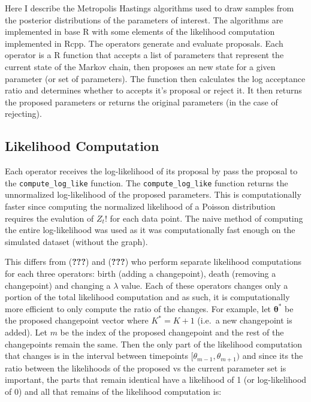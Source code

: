 \documentclass[]{article}
\numberwithin{equation}{section}
\begin{document}
Here I describe the Metropolis Hastings algorithms used to draw samples
from the posterior distributions of the parameters of interest. The
algorithms are implemented in base R with some elements of the
likelihood computation implemented in Rcpp. The operators generate and
evaluate proposals. Each operator is a R function that accepts a list of
parameters that represent the current state of the Markov chain, then
proposes an new state for a given parameter (or set of parameters). The
function then calculates the log acceptance ratio and determines whether
to accepts it's proposal or reject it. It then returns the proposed
parameters or returns the original parameters (in the case of
rejecting).

\hypertarget{likelihood-computation}{%
\subsection{Likelihood Computation}\label{likelihood-computation}}

Each operator receives the log-likelihood of its proposal by pass the
proposal to the \texttt{compute\_log\_like} function. The
\texttt{compute\_log\_like} function returns the unnormalized
log-likelihood of the proposed parameters. This is computationally
faster since computing the normalized likelihood of a Poisson
distribution requires the evalution of \(Z_{t}!\) for each data point.
The naive method of computing the entire log-likelihood was used as it
was computationally fast enough on the simulated dataset (without the
graph).

This differs from ({\textbf{???}}) and ({\textbf{???}}) who perform
separate likelihood computations for each three operators: birth (adding
a changepoint), death (removing a changepoint) and changing a
\(\lambda\) value. Each of these operators changes only a portion of the
total likelihood computation and as such, it is computationally more
efficient to only compute the ratio of the changes. For example, let
\(\boldsymbol{\theta^*}\) be the proposed changepoint vector where
\(K^* = K + 1\) (i.e.~a new changepoint is added). Let \(m\) be the
index of the proposed changepoint and the rest of the changepoints
remain the same. Then the only part of the likelihood computation that
changes is in the interval between timepoints
\([\theta_{m-1}, \theta_{m+1})\) and since its the ratio between the
likelihoods of the proposed vs the current parameter set is important,
the parts that remain identical have a likelihood of 1 (or
log-likelihood of 0) and all that remains of the likelihood computation
is:
\end{document}

